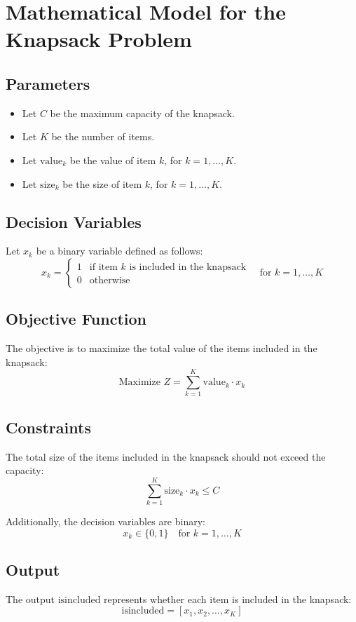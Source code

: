 \documentclass{article}
\begin{document}
\section*{Mathematical Model for the Knapsack Problem}

\subsection*{Parameters}
\begin{itemize}
    \item Let \( C \) be the maximum capacity of the knapsack.
    \item Let \( K \) be the number of items.
    \item Let \( \text{value}_k \) be the value of item \( k \), for \( k = 1, \ldots, K \).
    \item Let \( \text{size}_k \) be the size of item \( k \), for \( k = 1, \ldots, K \).
\end{itemize}

\subsection*{Decision Variables}
Let \( x_k \) be a binary variable defined as follows:
\[
x_k = 
\begin{cases} 
1 & \text{if item } k \text{ is included in the knapsack} \\
0 & \text{otherwise}
\end{cases} \quad \text{for } k = 1, \ldots, K
\]

\subsection*{Objective Function}
The objective is to maximize the total value of the items included in the knapsack:
\[
\text{Maximize } Z = \sum_{k=1}^{K} \text{value}_k \cdot x_k
\]

\subsection*{Constraints}
The total size of the items included in the knapsack should not exceed the capacity:
\[
\sum_{k=1}^{K} \text{size}_k \cdot x_k \leq C
\]

Additionally, the decision variables are binary:
\[
x_k \in \{0, 1\} \quad \text{for } k = 1, \ldots, K
\]

\subsection*{Output}
The output \( \text{isincluded} \) represents whether each item is included in the knapsack:
\[
\text{isincluded} = [x_1, x_2, \ldots, x_K]
\]
\end{document}
